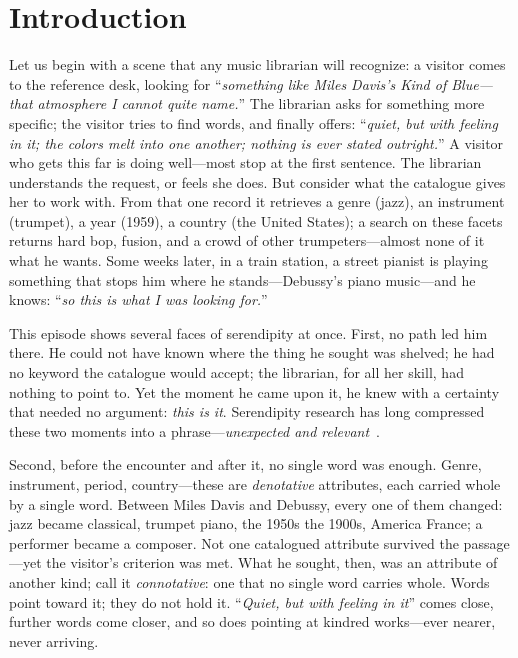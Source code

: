 \section{Introduction}\label{sec:introduction}

Let us begin with a scene that any music librarian will recognize: a visitor
comes to the reference desk, looking for ``\textit{something like Miles Davis's
    \textup{Kind of Blue}---that atmosphere I cannot quite name.}'' The librarian
asks for something more specific; the visitor tries to find words, and finally
offers: ``\textit{quiet, but with feeling in it; the colors melt into one
    another; nothing is ever stated outright.}'' A visitor who gets this far is
doing well---most stop at the first sentence. The librarian understands the
request, or feels she does. But consider what the catalogue gives her to work
with. From that one record it retrieves a genre (jazz), an instrument (trumpet),
a year (1959), a country (the United States); a search on these facets returns
hard bop, fusion, and a crowd of other trumpeters---almost none of it what he
wants. Some weeks later, in a train station, a street pianist is playing
something that stops him where he stands---Debussy's piano music---and he knows:
``\textit{so this is what I was looking for.}''

This episode shows several faces of serendipity at once. First, no path led
him there. He could not have known where the thing he sought was shelved; he
had no keyword the catalogue would accept; the librarian, for all her skill,
had nothing to point to. Yet the moment he came upon it, he knew with a
certainty that needed no argument: \textit{this is it}. Serendipity research
has long compressed these two moments into a phrase---\textit{unexpected and
    relevant}~\citep{Kotkov2016180}.

Second, before the encounter and after it, no single word was enough. Genre,
instrument, period, country---these are \emph{denotative} attributes, each
carried whole by a single word. Between Miles Davis and Debussy, every one of
them changed: jazz became classical, trumpet piano, the 1950s the 1900s,
America France; a performer became a composer. Not one catalogued attribute
survived the passage---yet the visitor's criterion was met. What he sought,
then, was an attribute of another kind; call it \emph{connotative}: one that
no single word carries whole. Words point toward it; they do not hold it.
``\textit{Quiet, but with feeling in it}'' comes close, further words come
closer, and so does pointing at kindred works---ever nearer, never arriving.

